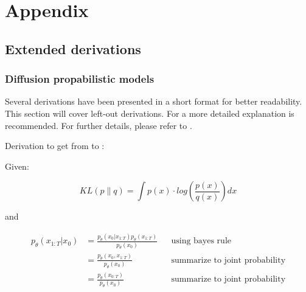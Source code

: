\renewcommand\thesection{A.\arabic{section}}
\renewcommand\thefigure{A-\arabic{figure}}   
\renewcommand\thetable{A-\arabic{table}}   
\renewcommand\theequation{A.\arabic{equation}}   

\chapter{Appendix} 
\label{ch:Appendix}

\section{Extended derivations}
\label{A:derivations}

\subsection[]{Diffusion propabilistic models}
\label{A:diffusion_prob}
Several derivations have been presented in a short format for better readability.
This section will cover left-out derivations.
For a more detailed explanation \cite{weng2021WhatAreDiffusion, outlier2022DiffusionModelsPaper} is recommended.
For further details, please refer to \cite{sohl-dickstein2015DeepUnsupervisedLearning, ho2020DenoisingDiffusionProbabilistic}.

Derivation to get from  to :

Given:

\begin{equation}
    \label{eqn:kl-divergence_appendix}
    KL(p\parallel q) = \int p(x)\cdot log(\frac{p(x)}{q(x)})dx
\end{equation}

and

\begin{equation}
    \label{eqn:simplify1}
	\begin{align}
    p_\theta(x_{1:T}|x_0) &= \frac{p_\theta(x_0|x_{1:T})p_\theta(x_{1:T})}{p_\theta(x_0)} && \textrm{using bayes rule}\\
	&= \frac{p_\theta(x_0,x_{1:T})}{p_\theta(x_{0})} && \textrm{summarize to joint probability}\\
	&= \frac{p_\theta(x_{0:T})}{p_\theta(x_{0})} && \textrm{summarize to joint probability}\\
	\end{align}
\end{equation}

